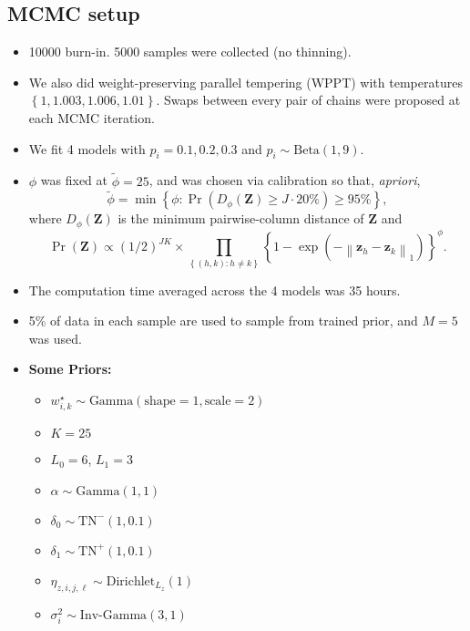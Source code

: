 \documentclass[11pt]{article} %
\newcommand{\norm}[1]{\left\lVert#1\right\rVert}
\newcommand{\p}[1]{\left(#1\right)}
\newcommand{\bc}[1]{ \left\{#1\right\} }
\newcommand{\Gam}{ \text{Gamma} }
\newcommand{\InvGamma}{ \text{Inv-Gamma} }
\def\Dir{\text{Dirichlet}}
\def\TN{\text{TN}}
\begin{document}
\subsection{MCMC setup}
\begin{itemize}
  \item 10000 burn-in. 5000 samples were collected (no thinning).
  \item We also did weight-preserving parallel tempering (WPPT) with temperatures 
        $\bc{1, 1.003, 1.006, 1.01}$. Swaps between every pair of chains were
        proposed at each MCMC iteration.
  \item We fit 4 models with $p_i = 0.1, 0.2, 0.3$ and $p_i \sim \text{Beta}(1, 9)$.
  \item $\phi$ was fixed at $\tilde\phi=25$, and was chosen via calibration
        so that, \emph{apriori}, 
        $$\tilde{\phi} = \min\bc{\phi : \Pr\p{D_\phi(\mathbf{Z}) \ge J \cdot 20\%} \ge 95\%},$$
        where $D_\phi(\mathbf{Z})$ is the minimum pairwise-column distance of $\mathbf{Z}$ and
        $$
        \Pr(\mathbf{Z}) \propto (1/2)^{JK} \times \prod_{\bc{(h,k): h \ne k}} 
        \bc{1 - \exp(-\norm{\mathbf{z}_h - \mathbf{z}_k}_1)}^\phi.
        $$
  \item The computation time averaged across the 4 models was 35 hours.
  \item 5\% of data in each sample are used to sample from trained prior, and
    $M=5$ was used.
  \item \textbf{Some Priors:}
  \begin{itemize}
    \item $w^\star_{i,k} \sim \Gam(\text{shape}=1, \text{scale}=2)$
    \item $K=25$
    \item $L_0=6$, $L_1=3$
    \item $\alpha \sim \Gam(1, 1)$
    \item $\delta_0 \sim \TN^-(1, 0.1)$
    \item $\delta_1 \sim \TN^+(1, 0.1)$
    \item $\eta_{z, i,j,\ell} \sim \Dir_{L_z}(1)$
    \item $\sigma^2_i \sim \InvGamma(3, 1)$
  \end{itemize}
\end{itemize}
\end{document}
